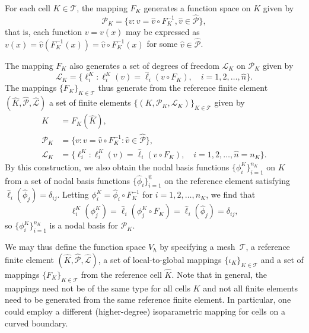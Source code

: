 For each cell $K \in \mathcal{T}$, the mapping $F_K$ generates a
function space on $K$ given by
\begin{equation}
  \mathcal{P}_K = \{ v : v = \hat{v} \circ F_K^{-1}, \hat{v} \in
  \hat{\mathcal{P}} \},
\end{equation}
that is, each function $v = v(x)$ may be expressed as $v(x) =
\hat{v}(F_K^{-1}(x)) = \hat{v} \circ F_K^{-1} (x)$ for some $\hat{v}
\in \hat{\mathcal{P}}$.

The mapping $F_K$ also generates a set of degrees of freedom
$\mathcal{L}_K$ on $\mathcal{P}_K$ given by
\begin{equation}
  \mathcal{L}_K = \{ \ell^K_i : \ell^K_i(v) = \hat{\ell}_i(v \circ
  F_K), \quad i=1,2,\ldots,\hat{n} \}.
\end{equation}
The mappings $\{F_K\}_{K\in\mathcal{T}}$ thus generate from the
reference finite
element~$(\hat{K},\hat{\mathcal{P}},\hat{\mathcal{L}})$ a set of
finite elements
$\{(K,\mathcal{P}_K,\mathcal{L}_K)\}_{K\in\mathcal{T}}$ given by
\begin{equation} \label{eq:elementgeneration}
  \begin{split}
  K &= F_K(\hat{K}), \\
  \mathcal{P}_K &= \{ v : v = \hat{v} \circ F_K^{-1} : \hat{v} \in \hat{\mathcal{P}} \}, \\
  \mathcal{L}_K &= \{ \ell^K_i : \ell^K_i(v) = \hat{\ell}_i(v \circ F_K),
  \quad i=1,2,\ldots,\hat{n} = n_K \}.
  \end{split}
\end{equation}
By this construction, we also obtain the nodal basis functions
$\{\phi^K_i\}_{i=1}^{n_K}$ on $K$ from a set of nodal basis functions
$\{\hat{\phi}_i\}_{i=1}^{\hat{n}}$ on the reference element satisfying
$\hat{\ell}_i(\hat{\phi}_j) = \delta_{ij}$. Letting $\phi^K_i =
\hat{\phi}_i \circ F_K^{-1}$ for $i=1,2,\ldots,n_K$, we find that
\begin{equation}
  \ell^K_i(\phi^K_j) = \hat{\ell}_i(\phi^K_j \circ F_K) = \hat{\ell}_i(\hat{\phi}_j) = \delta_{ij},
\end{equation}
so $\{\phi^K_i\}_{i=1}^{n_K}$ is a nodal basis for $\mathcal{P}_K$.

We may thus define the function space $V_h$ by specifying a
mesh~$\mathcal{T}$, a reference finite element $(\hat{K},
\hat{\mathcal{P}}, \hat{\mathcal{L}})$, a set of local-to-global
mappings $\{\iota_K\}_{K\in\mathcal{T}}$ and a set of mappings
$\{F_K\}_{K\in\mathcal{T}}$ from the reference cell $\hat{K}$. Note
that in general, the mappings need not be of the same type for all
cells $K$ and not all finite elements need to be generated from the
same reference finite element. In particular, one could employ a
different (higher-degree) isoparametric mapping for cells on a curved
boundary.

